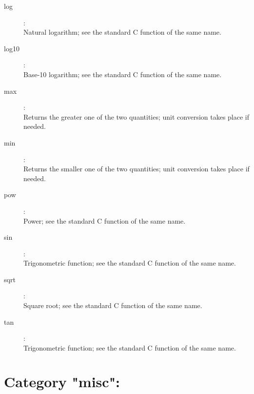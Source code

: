 \begin{description}
\item[log]:  \\
    Natural logarithm; see the standard C function of the same name.

\item[log10]:  \\
    Base-10 logarithm; see the standard C function of the same name.

\item[max]:  \\
    Returns the greater one of the two quantities; unit conversion takes place
    if needed.

\item[min]:  \\
    Returns the smaller one of the two quantities; unit conversion takes place
    if needed.

\item[pow]:  \\
    Power; see the standard C function of the same name.

\item[sin]:  \\
    Trigonometric function; see the standard C function of the same name.

\item[sqrt]:  \\
    Square root; see the standard C function of the same name.

\item[tan]:  \\
    Trigonometric function; see the standard C function of the same name.


\end{description}

\section{Category "misc":}
\label{sec:ned-functions:category-misc}

